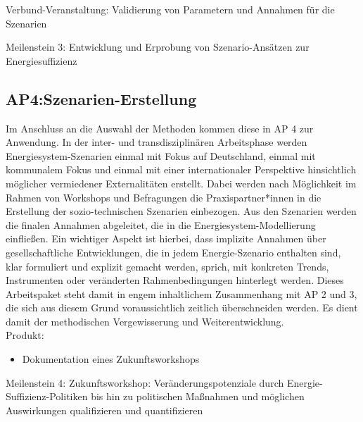 \documentclass[a4paper,11pt,twoside]{scrartcl}
\begin{document}
Verbund-Veranstaltung: Validierung von Parametern und Annahmen für die Szenarien

Meilenstein 3: Entwicklung und Erprobung von Szenario-Ansätzen zur Energiesuffizienz

\subsection*{AP4:Szenarien-Erstellung}
Im Anschluss an die Auswahl der Methoden kommen diese in AP 4 zur Anwendung. In der inter- und transdisziplinären Arbeitsphase werden Energiesystem-Szenarien einmal mit Fokus auf Deutschland, einmal mit kommunalem Fokus und einmal mit einer internationaler Perspektive hinsichtlich möglicher vermiedener Externalitäten erstellt. Dabei werden nach Möglichkeit im Rahmen von Workshops und Befragungen die Praxispartner*innen in die Erstellung der sozio-technischen Szenarien einbezogen. Aus den Szenarien werden die finalen Annahmen abgeleitet, die in die Energiesystem-Modellierung einfließen. Ein wichtiger Aspekt ist hierbei, dass implizite Annahmen über gesellschaftliche Entwicklungen, die in jedem Energie-Szenario enthalten sind, klar formuliert und explizit gemacht werden, sprich, mit konkreten Trends, Instrumenten oder veränderten Rahmenbedingungen hinterlegt werden. Dieses Arbeitspaket steht damit in engem inhaltlichem Zusammenhang mit AP 2 und 3, die sich aus diesem Grund voraussichtlich zeitlich überschneiden werden. Es dient damit der methodischen Vergewisserung und Weiterentwicklung.\\
Produkt:
\begin{itemize}
    \item Dokumentation eines Zukunftsworkshops
\end{itemize}
Meilenstein 4: Zukunftsworkshop: Veränderungspotenziale durch Energie-Suffizienz-Politiken bis hin zu politischen Maßnahmen und möglichen Auswirkungen qualifizieren und quantifizieren 


\end{document}
